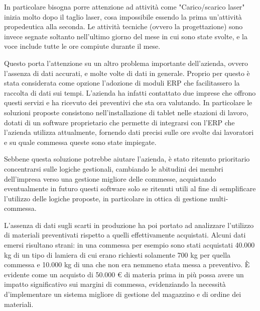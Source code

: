 \begin{multicols}{2}
	In particolare bisogna porre attenzione ad attività come "Carico/scarico laser" inizia molto dopo il taglio laser, cosa impossibile essendo la prima un'attività propedeutica alla seconda. Le attività tecniche (ovvero la progettazione) sono invece segnate soltanto nell'ultimo giorno del mese in cui sono state svolte, e la voce include tutte le ore compiute durante il mese.

	Questo porta l'attenzione su un altro problema importante dell'azienda, ovvero l'assenza di dati accurati, e molte volte di dati in generale. Proprio per questo è stata considerata come opzione l'adozione di moduli ERP che facilitassero la raccolta di dati sui tempi. L'azienda ha infatti contattato due imprese che offrono questi servizi e ha ricevuto dei preventivi che sta ora valutando.
	In particolare le soluzioni proposte consistono nell'installazione di tablet nelle stazioni di lavoro, dotati di un software proprietario che permette di integrarsi con l'ERP che l'azienda utilizza attualmente, fornendo dati precisi sulle ore svolte dai lavoratori e su quale commessa queste sono state impiegate.

	Sebbene questa soluzione potrebbe aiutare l'azienda, è stato ritenuto prioritario concentrarsi sulle logiche gestionali, cambiando le abitudini dei membri dell'impresa verso una gestione migliore delle commesse, acquistando eventualmente in futuro questi software solo se ritenuti utili al fine di semplificare l'utilizzo delle logiche proposte, in particolare in ottica di gestione multi-commessa.

	L’assenza di dati sugli scarti in produzione ha poi portato ad analizzare l’utilizzo di materiali preventivati rispetto a quelli effettivamente acquistati. Alcuni dati emersi risultano strani: in una commessa per esempio sono stati acquistati 40.000 kg di un tipo di lamiera di cui erano richiesti solamente 700 kg per quella commessa e 10.000 kg di una che non era nemmeno stata messa a preventivo. È evidente come un acquisto di 50.000 € di materia prima in più possa avere un impatto significativo sui margini di commessa, evidenziando la necessità d'implementare un sistema migliore di gestione del magazzino e di ordine dei materiali.

\end{multicols}

